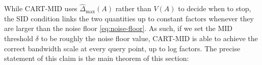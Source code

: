 \documentclass[11pt]{article}
\theoremstyle{plain}
\theoremstyle{definition}
\theoremstyle{remark}
\theoremstyle{plain}
\newcommand{\1}{\mathbbm{1}}
\begin{document}
While CART-MID uses $\widehat\Delta_{\max}(A)$ rather than $V(A)$ to decide when to stop, the SID condition links the two quantities up to constant factors whenever they are larger than the noise floor \eqref{eq:noise-floor}.
As such, if we set the MID threshold $\delta$ to be roughly the noise floor value, CART-MID is able to achieve the correct bandwidth scale at every query point, up to log factors.
The precise statement of this claim is the main theorem of this section:



\end{document}
